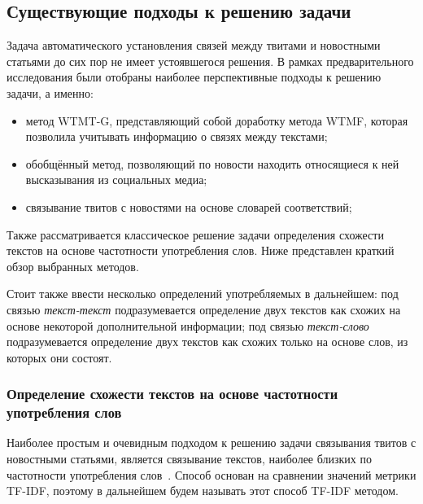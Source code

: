 \subsection{Существующие подходы к решению задачи}
    Задача автоматического установления связей между твитами и новостными статьями до сих пор не имеет устоявшегося решения.
    В рамках предварительного исследования были отобраны наиболее перспективные подходы к решению задачи, а именно:
    \begin{itemize}
        \item метод WTMT-G, представляющий собой доработку метода WTMF, которая позволила учитывать информацию о связях между текстами;
        \item обобщённый метод, позволяющий по новости находить относящиеся к ней высказывания из социальных медиа;
        \item связывание твитов с новостями на основе словарей соответствий;
    \end{itemize}
    Также рассматривается классическое решение задачи определения схожести текстов на основе частотности употребления слов.
    Ниже представлен краткий обзор выбранных методов.

    Стоит также ввести несколько определений употребляемых в дальнейшем:
    под связью \textit{текст-текст} подразумевается определение двух текстов как схожих на основе некоторой дополнительной информации;
    под связью \textit{текст-слово} подразумевается определение двух текстов как схожих только на основе слов, из которых они состоят.

    \subsubsection{Определение схожести текстов на основе частотности употребления слов}
        Наиболее простым и очевидным подходом к решению задачи связывания твитов с новостными статьями, является связывание текстов,
        наиболее близких по частотности употребления слов~\cite{tfidf}. Способ основан на сравнении значений метрики TF-IDF, поэтому в дальнейшем будем называть этот способ TF-IDF методом.

